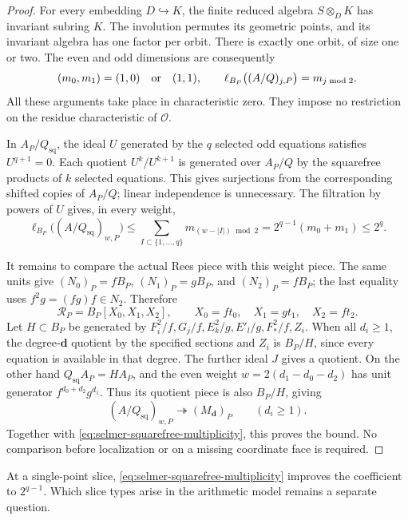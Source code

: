 \begin{proof}
For every embedding $D\hookrightarrow K$, the finite reduced
algebra $S\otimes_D K$ has invariant subring $K$. The involution
permutes its geometric points, and its invariant algebra has one
factor per orbit. There is exactly one orbit, of size one or two.
The even and odd dimensions are consequently
\begin{equation}
 (m_0,m_1)=(1,0)\quad\hbox{or}\quad(1,1),\qquad
 \ell_{B_P}\bigl((A/Q)_{j,P}\bigr)=m_{j\bmod2}.
 \label{eq:selmer-slice-parities}
\end{equation}
All these arguments take place in characteristic zero. They impose
no restriction on the residue characteristic of $\mathcal O$.

In $A_P/Q_{\mathrm{sq}}$, the ideal $U$ generated by the $q$ selected
odd equations satisfies $U^{q+1}=0$. Each quotient $U^k/U^{k+1}$
is generated over $A_P/Q$ by the squarefree products of $k$ selected
equations. This gives surjections from the corresponding shifted
copies of $A_P/Q$; linear independence is unnecessary. The filtration
by powers of $U$ gives, in every weight,
\begin{equation}
 \ell_{B_P}\bigl((A/Q_{\mathrm{sq}})_{w,P}\bigr)
 \le\sum_{I\subset\{1,\ldots,q\}}m_{(w-|I|)\bmod2}
 =2^{q-1}(m_0+m_1)\le2^q.
 \label{eq:selmer-squarefree-multiplicity}
\end{equation}

It remains to compare the actual Rees piece with this weight piece.
The same units give
$(N_0)_P=fB_P$, $(N_1)_P=gB_P$, and $(N_2)_P=fB_P$;
the last equality uses $f^2g=(fg)f\in N_2$. Therefore
\[
 \mathcal R_P=B_P[X_0,X_1,X_2],\qquad
 X_0=ft_0,\quad X_1=gt_1,\quad X_2=ft_2.
\]
Let $H\subset B_P$ be generated by
$F_i^2/f,G_j/f,E_k^2/g,E'_l/g,F_*^2/f,Z_i$.
When all $d_i\ge1$, the degree-$\boldsymbol d$ quotient by the
specified sections and $Z_i$ is $B_P/H$, since every equation is
available in that degree. The further ideal $J$ gives a quotient.
On the other hand $Q_{\mathrm{sq}}A_P=HA_P$, and the even weight
$w=2(d_1-d_0-d_2)$ has unit generator $f^{d_0+d_2}g^{d_1}$.
Thus its quotient piece is also $B_P/H$, giving
\[
 (A/Q_{\mathrm{sq}})_{w,P}\twoheadrightarrow
 (M_{\boldsymbol d})_P\qquad(d_i\ge1).
\]
Together with \eqref{eq:selmer-squarefree-multiplicity}, this proves
the bound. No comparison before localization or on a missing
coordinate face is required.
\end{proof}

At a single-point slice, \eqref{eq:selmer-squarefree-multiplicity}
improves the coefficient to $2^{q-1}$. Which slice types arise in the
arithmetic model remains a separate question.


